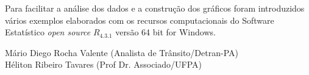 Para facilitar a análise dos dados e a construção dos gráficos foram introduzidos vários exemplos elaborados com os recursos computacionais do Software Estatístico \textit{open source} \textbf{$R_{4.3.1}$} versão 64 bit for Windows. 
\vst






\vst
\vst
\vst

\begin{centering}

\vst

\vsm

Mário Diego Rocha Valente (Analista de Trânsito/Detran-PA) \\
Héliton Ribeiro Tavares (Prof Dr. Associado/UFPA)\\




\end{centering}
